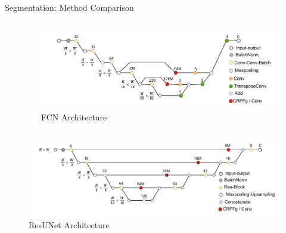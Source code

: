\documentclass[aspectratio=169]{beamer}
\let\oldcite\cite %
\renewcommand{\cite}[1]{{\tiny\oldcite{#1}}}
\begin{document}
\begin{frame}{Segmentation: Method Comparison}

\vspace{-0.9cm}
\begin{columns}[t] %
    \begin{column}{0.5\textwidth}
      \centering
      
    \end{column}

    \begin{column}{0.5\textwidth}
      \centering
      \begin{figure}
          \centering \includegraphics[width=0.98\textwidth]{Figures/fcn_arch.pdf}
          \caption{FCN Architecture \cite{LongSD14}}
      \end{figure}
    \end{column}
  \end{columns}


  \begin{columns}[t] %
    \begin{column}{0.5\textwidth}
      \centering
      \begin{figure}
          \centering \includegraphics[width=1\textwidth]{Figures/res_unet_arch.pdf}
          \caption{ResUNet Architecture \cite{resunet17}}
      \end{figure}
    \end{column}


\end{columns}
\end{frame}
\end{document}
